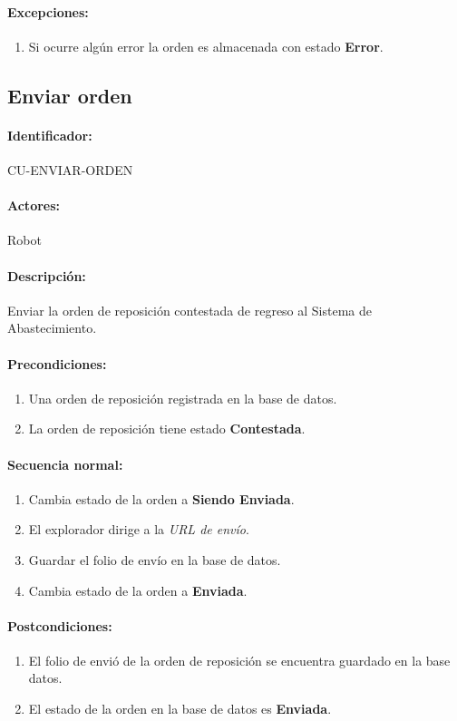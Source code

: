 \paragraph{Excepciones:}
\begin{enumerate}
  \item Si ocurre algún error la orden es almacenada con estado \textbf{Error}.
\end{enumerate}


\subsection{Enviar orden}\label{cu-enviar-orden}
\paragraph{Identificador:}
CU-ENVIAR-ORDEN
\paragraph{Actores:}
Robot
\paragraph{Descripción:}
Enviar la orden de reposición contestada de regreso al Sistema de Abastecimiento.
\paragraph{Precondiciones:}
\begin{enumerate}
  \item Una orden de reposición registrada en la base de datos.
  \item La orden de reposición tiene estado \textbf{Contestada}.
\end{enumerate}
\paragraph{Secuencia normal:}
\begin{enumerate}
  \item Cambia estado de la orden a \textbf{Siendo Enviada}.
  \item El explorador dirige a la \textit{URL de envío}.
  \item Guardar el folio de envío en la base de datos.
  \item Cambia estado de la orden a \textbf{Enviada}.
\end{enumerate}
\paragraph{Postcondiciones:}
\begin{enumerate}
  \item El folio de envió de la orden de reposición se encuentra guardado en la base datos.
  \item El estado de la orden en la base de datos es \textbf{Enviada}.
\end{enumerate}
